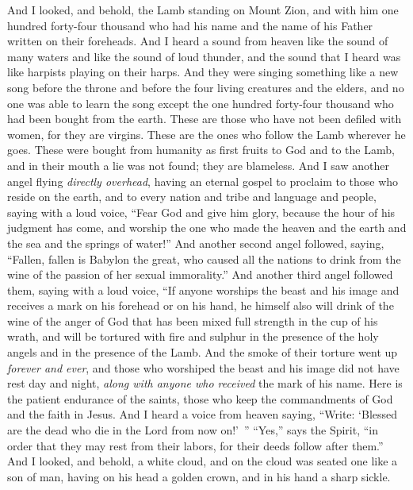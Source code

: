 \begin{biblechapter} %
 And I looked, and behold, the Lamb standing on Mount Zion, and with him one hundred forty-four thousand who had his name and the name of his Father written on their foreheads.
\verse And I heard a sound from heaven like the sound of many waters and like the sound of loud thunder, and the sound that I heard was like harpists playing on their harps.
\verse And they were singing something like a new song before the throne and before the four living creatures and the elders, and no one was able to learn the song except the one hundred forty-four thousand who had been bought from the earth.
\verse These are those who have not been defiled with women, for they are virgins. These are the ones who follow the Lamb wherever he goes. These were bought from humanity as first fruits to God and to the Lamb,
\verse and in their mouth a lie was not found; they are blameless.
 And I saw another angel flying \textit{directly overhead}, having an eternal gospel to proclaim to those who reside on the earth, and to every nation and tribe and language and people,
\verse saying with a loud voice, “Fear God and give him glory, because the hour of his judgment has come, and worship the one who made the heaven and the earth and the sea and the springs of water!”
\verse And another second angel followed, saying, “Fallen, fallen is Babylon the great, who caused all the nations to drink from the wine of the passion of her sexual immorality.”
\verse And another third angel followed them, saying with a loud voice, “If anyone worships the beast and his image and receives a mark on his forehead or on his hand,
\verse he himself also will drink of the wine of the anger of God that has been mixed full strength in the cup of his wrath, and will be tortured with fire and sulphur in the presence of the holy angels and in the presence of the Lamb.
\verse And the smoke of their torture went up \textit{forever and ever}, and those who worshiped the beast and his image did not have rest day and night, \textit{along with anyone who received} the mark of his name.
\verse Here is the patient endurance of the saints, those who keep the commandments of God and the faith in Jesus.
\verse And I heard a voice from heaven saying, “Write: ‘Blessed are the dead who die in the Lord from now on!’ ” “Yes,” says the Spirit, “in order that they may rest from their labors, for their deeds follow after them.”
 And I looked, and behold, a white cloud, and on the cloud was seated one like a son of man, having on his head a golden crown, and in his hand a sharp sickle.

\end{biblechapter}
